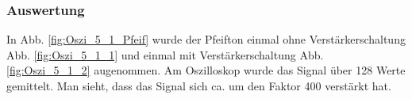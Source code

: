 \documentclass[12pt,a4paper]{article}
\begin{document}
\subsubsection*{Auswertung}
In Abb. \ref{fig:Oszi_5_1_Pfeif} wurde der Pfeifton einmal ohne Verstärkerschaltung Abb. \ref{fig:Oszi_5_1_1} und einmal mit Verstärkerschaltung Abb. \ref{fig:Oszi_5_1_2} augenommen. Am Oszilloskop wurde das Signal über 128 Werte gemittelt. Man sieht, dass das Signal sich ca. um den Faktor 400 verstärkt hat.
\end{document}
